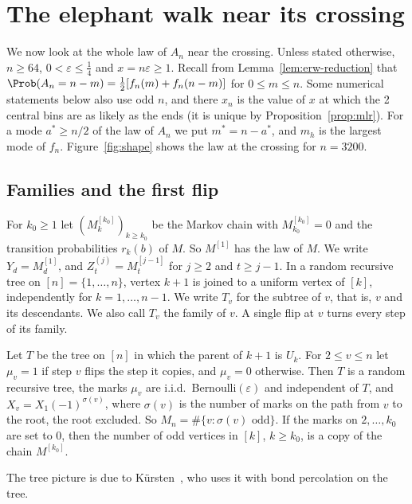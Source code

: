 \section{The elephant walk near its crossing}\label{sec:shape}

We now look at the whole law of $A_n$ near the crossing. Unless stated
otherwise, $n\ge64$, $0<\varepsilon\le\frac14$ and $x=n\varepsilon\ge1$.
Recall from Lemma~\ref{lem:erw-reduction} that
$\Prob(A_n=n-m)=\frac12[f_n(m)+f_n(n-m)]$ for $0\le m\le n$. Some numerical
statements below also use odd $n$, and there $x_n$ is the value of $x$ at
which the 2 central bins are as likely as the ends (it is unique by
Proposition~\ref{prop:mlr}). For a mode $a^*\ge n/2$ of the law of $A_n$ we
put $m^*=n-a^*$, and $m_h$ is the largest mode of $f_n$.
Figure~\ref{fig:shape} shows the law at the crossing for $n=3200$.

\subsection{Families and the first flip}

For $k_0\ge1$ let $(M^{[k_0]}_k)_{k\ge k_0}$ be the Markov chain with
$M^{[k_0]}_{k_0}=0$ and the transition probabilities $r_k(b)$ of $M$. So
$M^{[1]}$ has the law of $M$. We write $Y_d=M^{[1]}_d$, and
$Z^{(j)}_t=M^{[j-1]}_t$ for $j\ge2$ and $t\ge j-1$. In a random recursive
tree on $[n]=\{1,\dots,n\}$, vertex $k+1$ is joined to a uniform vertex of
$[k]$, independently for $k=1,\dots,n-1$. We write $T_v$ for the subtree of
$v$, that is, $v$ and its descendants. We also call $T_v$ the family of $v$.
A single flip at $v$ turns every step of its family.

\begin{lemma}\label{lem:tree}
Let $T$ be the tree on $[n]$ in which the parent of $k+1$ is $U_k$. For
$2\le v\le n$ let $\mu_v=1$ if step $v$ flips the step it copies, and
$\mu_v=0$ otherwise. Then $T$ is a random recursive tree, the marks $\mu_v$
are i.i.d.\ Bernoulli$(\varepsilon)$ and independent of $T$, and
$X_v=X_1(-1)^{\sigma(v)}$, where $\sigma(v)$ is the number of marks on the
path from $v$ to the root, the root excluded. So
$M_n=\#\{v:\sigma(v)\text{ odd}\}$. If the marks on $2,\dots,k_0$ are set to
$0$, then the number of odd vertices in $[k]$, $k\ge k_0$, is a copy of the
chain $M^{[k_0]}$.
\end{lemma}

The tree picture is due to K\"ursten~\cite{kursten2016}, who uses it with
bond percolation on the tree.

